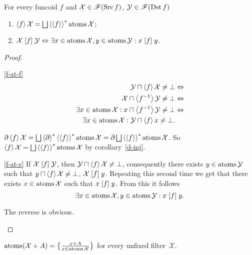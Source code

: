 \begin{lem}\label{fcd-atoms}
For every funcoid $f$ and
$\mathcal{X}\in\mathscr{F}(\operatorname{Src} f)$,
$\mathcal{Y}\in\mathscr{F}(\operatorname{Dst} f)$
\begin{enumerate}
\item \label{f-at-f}$\supfun f\mathcal{X}=\bigsqcup\rsupfun{\supfun
f}\atoms\mathcal{X}$;
\item \label{f-at-r}$\mathcal{X}\mathrel{\left[f\right]}\mathcal{Y}\Leftrightarrow\exists
x\in\operatorname{atoms}\mathcal{X},y\in\operatorname{atoms}\mathcal{Y}:x\mathrel{\left[f\right]}y$.
\end{enumerate}
\end{lem}
\begin{proof}
~
\begin{widedisorder}
\item [{\ref{f-at-f}}] ~
\begin{align*}
\mathcal{Y}\sqcap\left\langle f\right\rangle\mathcal{X}\ne\bot &
\Leftrightarrow\\
\mathcal{X}\sqcap\left\langle f^{-1}\right\rangle\mathcal{Y}\ne\bot &
\Leftrightarrow\\
\exists
x\in\operatorname{atoms}\mathcal{X}:x\sqcap\left\langle f^{-1}\right\rangle\mathcal{Y}\ne\bot & \Leftrightarrow\\
\exists x\in\operatorname{atoms}\mathcal{X}:\mathcal{Y}\sqcap\left\langle f\right\rangle x\ne\bot.
\end{align*}



$\corestar\supfun f\mathcal{X}=\bigsqcup\rsupfun{\corestar}\rsupfun{\supfun
f}\atoms\mathcal{X}=\corestar\bigsqcup\rsupfun{\supfun f}\atoms\mathcal{X}$.
So $\supfun f\mathcal{X}=\bigsqcup\rsupfun{\supfun f}\atoms\mathcal{X}$
by corollary~\ref{d-inj}.

\item [{\ref{f-at-r}}] If $\mathcal{X}\mathrel{\left[f\right]}\mathcal{Y}$, then
$\mathcal{Y}\sqcap\left\langle f\right\rangle\mathcal{X}\ne\bot$,
consequently there exists $y\in\operatorname{atoms}\mathcal{Y}$ such that $y\sqcap\left\langle f\right\rangle\mathcal{X}\ne\bot$,
$\mathcal{X}\mathrel{\left[f\right]}y$. Repeating this second time we get that there
exists $x\in\operatorname{atoms}\mathcal{X}$ such that $x\mathrel{\left[f\right]}y$. From this
it follows
\[
\exists x\in\operatorname{atoms}\mathcal{X},y\in\operatorname{atoms}\mathcal{Y}:x\mathrel{\left[f\right]}y.
\]



The reverse is obvious.

\end{widedisorder}
\end{proof}

\begin{prop}
$\operatorname{atoms}(\mathcal{X}\div A)=
\left\{ \frac{x\div A}{x\in\operatorname{atoms}\mathcal{X}}\right\}$
for every unfixed filter~$\mathcal{X}$.
\end{prop}

